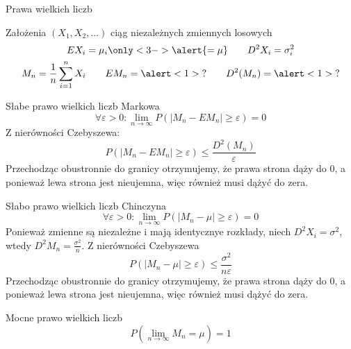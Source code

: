 \documentclass{mp}
\begin{document}
\begin{frame}{Prawa wielkich liczb}
\begin{block}{Założenia}
$(X_1,X_2,\ldots)$ ciąg \alert<1>{niezależnych} zmiennych losowych \\
\begin{gather*}
EX_i=\mu_i\only<3->{\alert{=\mu}} \qquad D^2X_i=\sigma_i^2 \\
M_n=\frac{1}{n}\sum_{i=1}^n X_i \qquad EM_n=\alert<1>{?} \qquad D^2(M_n)=\alert<1>{?}
\end{gather*}
\note{\[EM_n=\frac{1}{n}\sum_{i=1}^n \mu_i \qquad D^2(M_n)=\frac{1}{n^2}\sum_{i=1}^n\sigma_i^2\]}
\end{block}
{
\begin{block}{Słabe prawo wielkich liczb Markowa}
\[ \forall \varepsilon>0\colon \lim_{n\to\infty} P(\left|M_n-EM_n\right|\geq\varepsilon)=0 \]
\note
{
	Z nierówności Czebyszewa:
	\[P(\left|M_n-EM_n\right|\geq\varepsilon)\leq \frac{D^2(M_n)}{\varepsilon}\]
	Przechodząc obustronnie do granicy otrzymujemy, że prawa strona dąży do 0, a ponieważ lewa strona jest nieujemna, więc również musi dążyć do zera.
}
\end{block}
}
{
\begin{block}{Słabo prawo wielkich liczb Chinczyna}
\[ \forall \varepsilon>0\colon \lim_{n\to\infty} P(\left|M_n-\mu\right|\geq\varepsilon)=0 \]
\note
{
	Ponieważ zmienne są niezależne i mają identycznye rozkłady, niech $D^2X_i=\sigma^2$, wtedy $D^2M_n=\frac{\sigma^2}{n}$. Z nierówności Czebyszewa
	\[P(\left|M_n-\mu\right|\geq\varepsilon)\leq \frac{\sigma^2}{n\varepsilon} \]
	Przechodząc obustronnie do granicy otrzymujemy, że prawa strona dąży do 0, a ponieważ lewa strona jest nieujemna, więc również musi dążyć do zera.
}
\end{block}
}
{
\begin{block}{Mocne prawo wielkich liczb}
\[P(\lim_{n\to\infty} M_n=\mu)=1\]
\end{block}
}
\end{frame}
\end{document}
